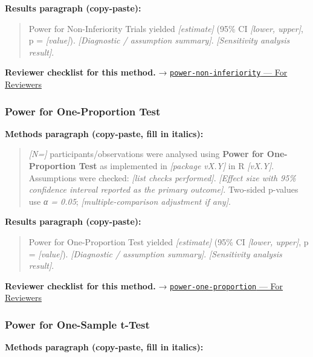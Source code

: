 \documentclass[
]{article}
\begin{document}
\textbf{Results paragraph (copy-paste):}

\begin{quote}
Power for Non-Inferiority Trials yielded \emph{{[}estimate{]}} (95\% CI
\emph{{[}lower, upper{]}}, p = \emph{{[}value{]}}). \emph{{[}Diagnostic
/ assumption summary{]}}. \emph{{[}Sensitivity analysis result{]}}.
\end{quote}

\textbf{Reviewer checklist for this method.} →
\href{../chapters/05-power/power-non-inferiority.Rmd\#for-reviewers}{\texttt{power-non-inferiority}
--- For Reviewers}

\subsubsection{Power for One-Proportion
Test}\label{power-for-one-proportion-test}

\textbf{Methods paragraph (copy-paste, fill in italics):}

\begin{quote}
\emph{{[}N={]}} participants/observations were analysed using
\textbf{Power for One-Proportion Test} as implemented in
\emph{{[}package vX.Y{]}} in R \emph{{[}vX.Y{]}}. Assumptions were
checked: \emph{{[}list checks performed{]}}. \emph{{[}Effect size with
95\% confidence interval reported as the primary outcome{]}}. Two-sided
p-values use \emph{α = 0.05}; \emph{{[}multiple-comparison adjustment if
any{]}}.
\end{quote}

\textbf{Results paragraph (copy-paste):}

\begin{quote}
Power for One-Proportion Test yielded \emph{{[}estimate{]}} (95\% CI
\emph{{[}lower, upper{]}}, p = \emph{{[}value{]}}). \emph{{[}Diagnostic
/ assumption summary{]}}. \emph{{[}Sensitivity analysis result{]}}.
\end{quote}

\textbf{Reviewer checklist for this method.} →
\href{../chapters/05-power/power-one-proportion.Rmd\#for-reviewers}{\texttt{power-one-proportion}
--- For Reviewers}

\subsubsection{Power for One-Sample
t-Test}\label{power-for-one-sample-t-test}

\textbf{Methods paragraph (copy-paste, fill in italics):}
\end{document}

